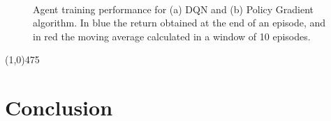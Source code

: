 \documentclass[a4paper, 11pt]{article}
\newcommand{\hl}{\begin{center} \line(1,0){475} \end{center}} %
\begin{document}
 \begin{figure}[!t]
  \begin{center}
 	\\
    \caption{Agent training performance for (a) DQN and (b) Policy Gradient algorithm. In blue the return obtained at the end of an episode, and in red the moving average calculated in a window of 10 episodes.}
    \label{fig:Preprocessing}
  \end{center}
\end{figure}
\hl

\section{Conclusion}
\end{document}
